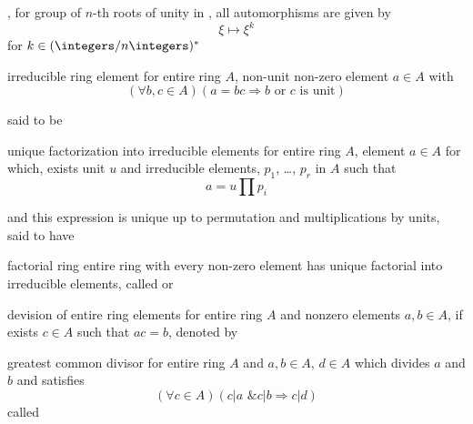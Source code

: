 \documentclass[17pt,landscape]{foils}
\begin{document}
{\bit
\vitem
	\eg,
	for group of $n$-th roots of unity in \complexes,
	all automorphisms are given by
	$$
		\xi \mapsto \xi^k
	$$
	for $k\in(\integers/n\integers)^\ast$
\eit



\begin{mydefinition}{irreducible ring element}%
	for entire ring $A$,
	non-unit non-zero element $a\in A$ with
	$$
		\left(
			\forall b, c\in A
		\right)
		\left(
			a = bc \Rightarrow b \mbox{ or } c \mbox{ is unit}
		\right)
	$$

	said to be 
\end{mydefinition}

\vfill
\begin{mydefinition}{unique factorization into irreducible elements}%
	for entire ring $A$,
	element $a\in A$
	for which,
	exists unit $u$ and irreducible elements, $p_1$, \ldots, $p_r$ in $A$ such that
	$$
		a = u \prod p_i
	$$

	and this expression is unique up to permutation and multiplications by units,
	said to have 
\end{mydefinition}

\vfill
\begin{mydefinition}{factorial ring}%
	entire ring with every non-zero element has unique factorial into irreducible elements,
	called  or 
\end{mydefinition}



\begin{mydefinition}{devision of entire ring elements}%
	for entire ring $A$ and nonzero elements $a,b\in A$,
	if exists $c\in A$ such that $ac=b$,
	denoted by 
\end{mydefinition}

\begin{mydefinition}{greatest common divisor}%
	for entire ring $A$ and $a,b\in A$,
	$d\in A$ which divides $a$ and $b$ and satisfies
	$$
		\left(
			\forall c \in A
		\right)
		\left(
			c|a \mbox{ \& } c|b
			\Rightarrow
			c | d
		\right)
	$$
	called 
\end{mydefinition}

}
\end{document}
